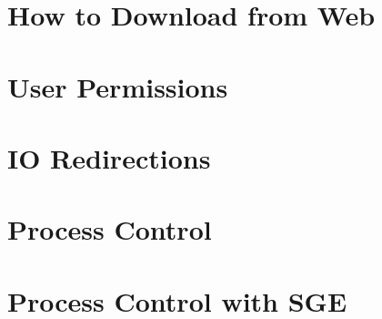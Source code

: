 \documentclass{beamer}
\begin{document}
	\section{How to Download from Web}
	
	\section{User Permissions}
	
	\section{IO Redirections}
	
	\section{Process Control}
	
	\section{Process Control with SGE}
\end{document}
